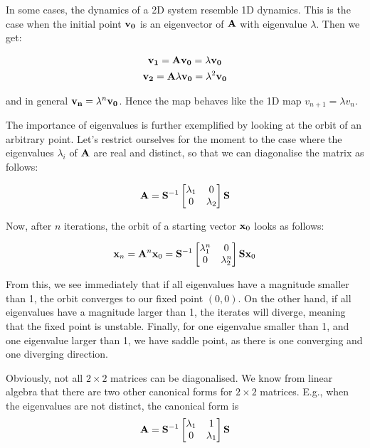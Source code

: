In some cases, the dynamics of a 2D system resemble 1D dynamics. This is the case when the initial point ${\bf v_0}$ is an eigenvector of ${\bf A}$ with eigenvalue $\lambda$. Then we get:

\begin{gather}
{\bf v_1} = {\bf A}{\bf v_0} = \lambda {\bf v_0} \\
{\bf v_2} = {\bf A}\lambda {\bf v_0} = \lambda^2 {\bf v_0} 
\end{gather} 

and in general ${\bf v_n} = \lambda^n {\bf v_0}$. Hence the map behaves like the 1D map $v_{n+1} = \lambda v_n$.

The importance of eigenvalues is further exemplified by looking at the orbit of an arbitrary point. Let's restrict ourselves for the moment to the case where the eigenvalues $\lambda_i$ of ${\bf A}$ are real and distinct, so that we can diagonalise the matrix as follows:

\begin{equation}
{\bf A} = {\bf S}^{-1}
\begin{bmatrix}
\lambda_{1} & 0 \\
0 & \lambda_{2}
\end{bmatrix} 
{\bf S}
\end{equation} 

Now, after $n$ iterations, the orbit of a starting vector ${\bf x}_0$ looks as follows:

\begin{equation}
{\bf x}_n = {\bf A}^n {\bf x}_0 = {\bf S}^{-1}
\begin{bmatrix}
\lambda_1^n & 0 \\
0 & \lambda_2^n
\end{bmatrix} 
{\bf S} {\bf x}_0 
\end{equation} 

From this, we see immediately that if all eigenvalues have a magnitude smaller than 1, the orbit converges to our fixed point $(0,0)$. On the other hand, if all eigenvalues have a magnitude larger than 1, the iterates will diverge, meaning that the fixed point is unstable. Finally, for one eigenvalue smaller than 1, and one eigenvalue larger than 1, we have saddle point, as there is one converging and one diverging direction.

Obviously, not all $2 \times 2$ matrices can be diagonalised. We know from linear algebra that there are two other canonical forms for $2 \times 2$ matrices. E.g., when the eigenvalues are not distinct, the canonical form is
\begin{equation}
{\bf A} = 
{\bf S}^{-1}
\begin{bmatrix}
\lambda_1 & 1 \\
0 & \lambda_1
\end{bmatrix} 
{\bf S}
\end{equation} 


